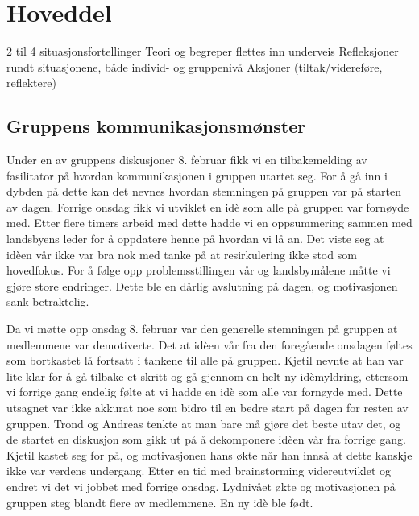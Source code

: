 \section{Hoveddel} 2 til 4 situasjonsfortellinger Teori og begreper
flettes inn underveis Refleksjoner rundt situasjonene, både individ- og
gruppenivå Aksjoner (tiltak/videreføre, reflektere)

\subsection{Gruppens kommunikasjonsmønster} %
Under en av gruppens diskusjoner 8. februar fikk vi en tilbakemelding av
fasilitator på hvordan kommunikasjonen i gruppen utartet seg. For å gå
inn i dybden på dette kan det nevnes hvordan stemningen på gruppen var
på starten av dagen. Forrige onsdag fikk vi utviklet en idè som alle på
gruppen var fornøyde med. Etter flere timers arbeid med dette hadde vi
en oppsummering sammen med landsbyens leder for å oppdatere henne på
hvordan vi lå an. Det viste seg at idèen vår ikke var bra nok med tanke
på at resirkulering ikke stod som hovedfokus. For å følge opp
problemsstillingen vår og landsbymålene måtte vi gjøre store endringer.
Dette ble en dårlig avslutning på dagen, og motivasjonen sank
betraktelig.

Da vi møtte opp onsdag 8. februar var den generelle stemningen på
gruppen at medlemmene var demotiverte. Det at idèen vår fra den
foregående onsdagen føltes som bortkastet lå fortsatt i tankene til alle
på gruppen. Kjetil nevnte at han var lite klar for å gå tilbake et
skritt og gå gjennom en helt ny idèmyldring, ettersom vi forrige gang
endelig følte at vi hadde en idè som alle var fornøyde med. Dette
utsagnet var ikke akkurat noe som bidro til en bedre start på dagen for
resten av gruppen. Trond og Andreas tenkte at man bare må gjøre det
beste utav det, og de startet en diskusjon som gikk ut på å dekomponere
idèen vår fra forrige gang. Kjetil kastet seg for på, og motivasjonen
hans økte når han innså at dette kanskje ikke var verdens undergang.
Etter en tid med brainstorming videreutviklet og endret vi det vi jobbet
med forrige onsdag. Lydnivået økte og motivasjonen på gruppen steg
blandt flere av medlemmene. En ny idè ble født.

